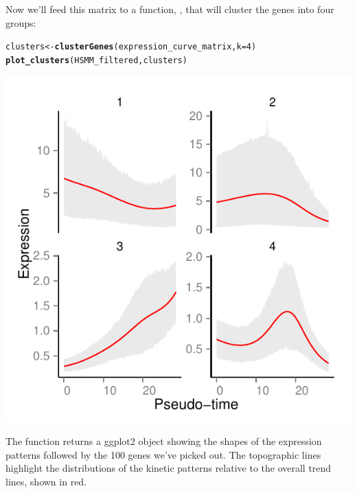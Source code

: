 \documentclass[10pt,oneside]{article}\usepackage[]{graphicx}\usepackage[]{color}
\makeatletter
\def\maxwidth{ %
  \ifdim\Gin@nat@width>\linewidth
    \linewidth
  \else
    \Gin@nat@width
  \fi
}
\newcommand{\hlnum}[1]{\textcolor[rgb]{0.686,0.059,0.569}{#1}}%
\newcommand{\hlstd}[1]{\textcolor[rgb]{0.345,0.345,0.345}{#1}}%
\newcommand{\hlkwb}[1]{\textcolor[rgb]{0.69,0.353,0.396}{#1}}%
\newcommand{\hlkwc}[1]{\textcolor[rgb]{0.333,0.667,0.333}{#1}}%
\newcommand{\hlkwd}[1]{\textcolor[rgb]{0.737,0.353,0.396}{\textbf{#1}}}%
\newenvironment{kframe}{%
 \def\at@end@of@kframe{}%
 \ifinner\ifhmode%
  \def\at@end@of@kframe{\end{minipage}}%
  \begin{minipage}{\columnwidth}%
 \fi\fi%
 \def\FrameCommand##1{\hskip\@totalleftmargin \hskip-\fboxsep
 \colorbox{shadecolor}{##1}\hskip-\fboxsep
     \hskip-\linewidth \hskip-\@totalleftmargin \hskip\columnwidth}%
 \MakeFramed {\advance\hsize-\width
   \@totalleftmargin\z@ \linewidth\hsize
   \@setminipage}}%
 {\par\unskip\endMakeFramed%
 \at@end@of@kframe}
\newenvironment{knitrout}{}{} %
\makeatother
\begin{document}
Now we'll feed this matrix to a function, , that will cluster the genes into four groups:

\begin{knitrout}
\color{fgcolor}\begin{kframe}
\begin{alltt}
\hlstd{clusters} \hlkwb{<-} \hlkwd{clusterGenes}\hlstd{(expression_curve_matrix,} \hlkwc{k}\hlstd{=}\hlnum{4}\hlstd{)}
\hlkwd{plot_clusters}\hlstd{(HSMM_filtered, clusters)}
\end{alltt}


{\ttfamily\noindent{}}\end{kframe}

{\centering \includegraphics[width=\maxwidth]{figure/cluster_and_plot-1} 

}



\end{knitrout}

The  function returns a ggplot2 object showing the shapes of the expression patterns followed by the 100 genes we've picked out.  The topographic lines highlight the distributions of the kinetic patterns relative to the overall trend lines, shown in red.
\end{document}
